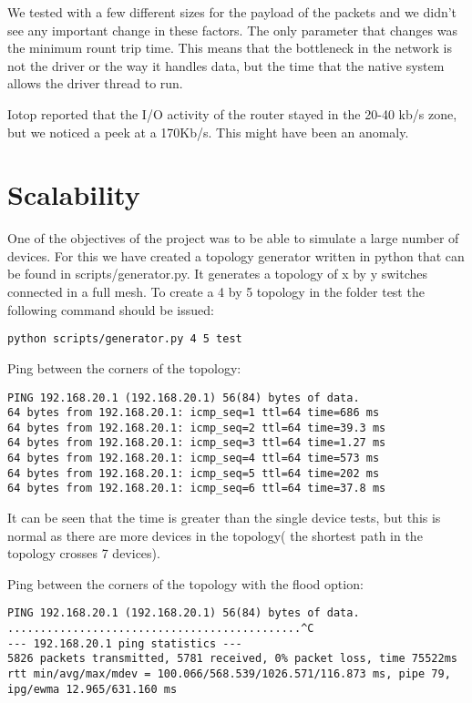 We tested with a few different sizes for the payload of the packets and we didn't see any important change in these
factors. The only parameter that changes was the minimum rount trip time.
This means that the bottleneck in the network is not the driver or the way it handles data, but the time
that the native system allows the driver thread to run.

Iotop reported that the I/O activity of the router stayed in the 20-40 kb/s zone, but we noticed a peek
at a 170Kb/s. This might have been an anomaly.

\section{Scalability}
\label{sec:scalability}

One of the objectives of the project was to be able to simulate a large number of devices. For this we have
created a topology generator written in python that can be found in scripts/generator.py. It generates a topology of
x by y switches connected in a full mesh. To create a 4 by 5 topology in the folder test the following command
should be issued:
\begin{lstlisting}
python scripts/generator.py 4 5 test
\end{lstlisting}

Ping between the corners of the topology:
\begin{lstlisting}
PING 192.168.20.1 (192.168.20.1) 56(84) bytes of data.
64 bytes from 192.168.20.1: icmp_seq=1 ttl=64 time=686 ms
64 bytes from 192.168.20.1: icmp_seq=2 ttl=64 time=39.3 ms
64 bytes from 192.168.20.1: icmp_seq=3 ttl=64 time=1.27 ms
64 bytes from 192.168.20.1: icmp_seq=4 ttl=64 time=573 ms
64 bytes from 192.168.20.1: icmp_seq=5 ttl=64 time=202 ms
64 bytes from 192.168.20.1: icmp_seq=6 ttl=64 time=37.8 ms
\end{lstlisting}
It can be seen that the time is greater than the single device
tests, but this is normal as there are more devices in the topology(
the shortest path in the topology crosses 7 devices).

Ping between the corners of the topology with the flood option:
\begin{lstlisting}
PING 192.168.20.1 (192.168.20.1) 56(84) bytes of data.
.............................................^C                                
--- 192.168.20.1 ping statistics ---
5826 packets transmitted, 5781 received, 0% packet loss, time 75522ms
rtt min/avg/max/mdev = 100.066/568.539/1026.571/116.873 ms, pipe 79, ipg/ewma 12.965/631.160 ms
\end{lstlisting}

